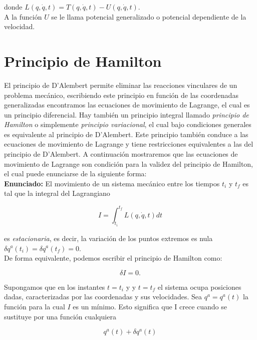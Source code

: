 \documentclass[12pt]{report}
\begin{document}
donde $L(q,\dot{q},t) = T(q,\dot{q},t)-U(q,\dot{q},t)$. \\

A la función $U$ se le llama potencial generalizado o potencial dependiente de la velocidad. 



\section{Principio de Hamilton}

El principio de D’Alembert permite eliminar las reacciones vinculares de un problema mecánico, escribiendo este principio en función de las coordenadas generalizadas encontramos las ecuaciones de movimiento de Lagrange, el cual es un principio diferencial. Hay también un principio integral llamado \textit{principio de Hamilton} o simplemente \textit{principio variacional}, el cual bajo condiciones generales es equivalente al principio de D’Alembert. Este principio también conduce a las ecuaciones de movimiento de Lagrange y tiene restricciones equivalentes a las del principio de D’Alembert. A continuación mostraremos que las ecuaciones de movimiento de Lagrange son condición para la validez del principio de Hamilton, el cual puede enunciarse de la siguiente forma: \\

\textbf{Enunciado:} El movimiento de un sistema mecánico entre los tiempos $t_i$ y $t_f$ es tal que la integral del Lagrangiano

\begin{equation}
I=\int_{t_i}^{t_f} L \left( q,\dot{q},t \right) dt
\end{equation}


es \textit{estacionaria}, es decir, la variación de los puntos extremos es nula $\displaystyle \delta q^a(t_i)=\delta q^a(t_f)=0$. \\

De forma equivalente, podemos escribir el principio de Hamilton como:

\begin{equation}
\delta I=0.
\end{equation}


Supongamos que en los instantes $t=t_i$ y y $t=t_f$ el sistema ocupa posiciones dadas, caracterizadas por las coordenadas y sus velocidades. Sea $q^a=q^a(t)$ la función para la cual $I$  es un mínimo. Esto significa que I crece cuando se sustituye por una función cualquiera

\begin{equation}
q^a(t)+\delta q^a(t)
\end{equation}
\end{document}
